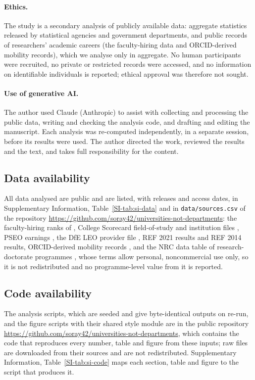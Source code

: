 \documentclass[11pt]{article}
\newcommand{\SItab}[1]{Supplementary Information, Table~\ref{SI-#1}}
\begin{document}
\paragraph{Ethics.} The study is a secondary analysis of publicly available data: aggregate statistics released by
statistical agencies and government departments, and public records of researchers' academic careers (the
faculty-hiring data and ORCID-derived mobility records), which we analyse only in aggregate. No human participants
were recruited, no private or restricted records were accessed, and no information on identifiable individuals is
reported; ethical approval was therefore not sought.

\paragraph{Use of generative AI.} The author used Claude (Anthropic) to assist with collecting and processing the public data, writing and checking the analysis
code, and drafting and editing the manuscript. Each analysis was re-computed independently, in a separate session,
before its results were used. The author directed the work, reviewed the results and the text, and takes full
responsibility for the content.

\subsection*{Data availability}
All data analysed are public and are listed, with releases and access dates, in \SItab{tab:si-data} and in
\texttt{data/sources.csv} of the repository \url{https://github.com/soray42/universities-not-departments}: the
faculty-hiring ranks of \citet{wapman2026data}, College Scorecard field-of-study and institution files
\citep{scorecard}, PSEO earnings \citep{pseo2026}, the DfE LEO provider file \citep{dfe_leo_provider}, REF 2021 results
\citep{ref2021results} and REF 2014 results, ORCID-derived mobility records \citep{li2026orcid}, and the NRC data
table of research-doctorate programmes \citep{nrc2011data}, whose terms allow personal, noncommercial use only, so it is
not redistributed and no programme-level value from it is reported.

\subsection*{Code availability}
The analysis scripts, which are seeded and give
byte-identical outputs on re-run, and the figure scripts with their shared style module are in the public repository
\url{https://github.com/soray42/universities-not-departments}, which contains the code that reproduces every number,
table and figure from these inputs; raw files are downloaded from their sources and are not redistributed.
\SItab{tab:si-code} maps each section, table and figure to the script that produces it.
\end{document}
